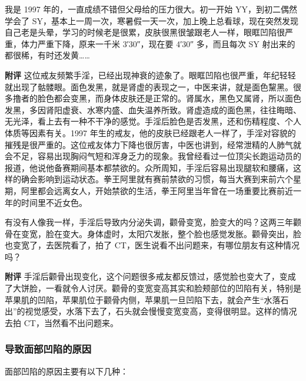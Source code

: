 \begin{case}[面部凹陷]
    我是 1997 年的，一直成绩不错但父母给的压力很大。初一开始 YY，到初二偶然学会了 SY，基本上一周一次，寒暑假一天一次，加上晚上总看球，现在突然发现自己老是头晕，学习的时候老是很累，皮肤很黑很皱跟老人一样，眼眶凹陷很严重，体力严重下降，原来一千米 3\unit{\arcminute}30\unit{\arcsecond}，现在要 4\unit{\arcminute}30\unit{\arcsecond} 多，而且每次 SY 射出来的都很稀，有时还发黄……

    \textbf{附评} 这位戒友频繁手淫，已经出现神衰的迹象了。眼眶凹陷也很严重，年纪轻轻就出现了骷髅眼。面色发黑，就是肾虚的表现之一，中医来讲，就是面色黧黑。很多撸者的脸色都会变黑，而身体皮肤还是正常的。肾属水，黑色又属肾，所以面色发黑，多因肾阳虚衰、水寒内盛、血失温养所致。肾虚造成的面色黑，往往晦暗、无光泽，看上去有一种不干净的感觉。手淫后脸色是否发黑，还和伤精程度、个人体质等因素有关。1997 年生的戒友，他的皮肤已经跟老人一样了，手淫对容貌的摧残是很严重的。这位戒友体力下降也很厉害，中医也讲到，经常泄精的人肺气就会不足，容易出现胸闷气短和浑身乏力的现象。我曾经看过一位顶尖长跑运动员的报道，他说他备赛期间基本都禁欲的。众所周知，手淫后容易出现腿软和腰痛，这样的确会影响到运动状态。拳王阿里就有赛前禁欲的习惯，每当大赛到来前六个星期，阿里都会远离女人，开始禁欲的生活，拳王阿里当年曾在一场重要比赛前近一年的时间里不近女色。
\end{case}

\begin{case}[面部凹陷]
    有没有人像我一样，手淫后导致内分泌失调，颧骨变宽，脸变大的吗？这两三年颧骨在变宽，脸在变大。身体虚时，太阳穴发胀，整个脸也感觉发胀。颧骨突出，脸也变宽了，去医院看了，拍了 CT，医生说看不出问题来，有哪位朋友有这种情况吗？

    \textbf{附评} 手淫后颧骨出现变化，这个问题很多戒友都反馈过，感觉脸也变大了，变成了大饼脸，一看就令人讨厌。颧骨的变宽变高其实和脸颊部位的凹陷有关，特别是苹果肌的凹陷，苹果肌位于颧骨内侧，苹果肌一旦凹陷下去，就会产生“水落石出”的视觉感受，水落下去了，石头就会慢慢变宽变高，变得很明显。这样的情况去拍 CT，当然看不出问题来。
\end{case}

\subsubsection{导致面部凹陷的原因}

面部凹陷的原因主要有以下几种：

